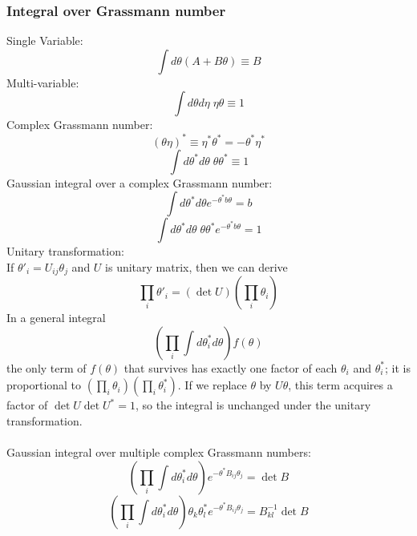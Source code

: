 \subsubsection{Integral over Grassmann number}
\noindent
Single Variable:
\[\int d\theta (A + B\theta) \equiv B\]
Multi-variable:
\[\int d\theta d\eta \; \eta \theta \equiv 1\]
Complex Grassmann number:
\[(\theta \eta)^* \equiv \eta^* \theta^* = -\theta^* \eta^*\]
\[\int d\theta^* d\theta \; \theta \theta^* \equiv 1\]
Gaussian integral over a complex Grassmann number:
\[\int d\theta^* d\theta e^{-\theta^* b \theta} = b\]
\[\int d\theta^* d\theta \; \theta \theta^* e^{-\theta^* b \theta}  = 1\]
Unitary transformation:\\
If $\theta'_i = U_{ij}\theta_j$ and $U$ is unitary matrix, then we can derive
\[\prod_i \theta'_i = (\det U) (\prod_i \theta_i)\]
In a general integral
\[(\prod_i \int d\theta^*_i d\theta) f(\theta)\]
the only term of $f(\theta)$ that survives has exactly one factor of each $\theta_i$ and $\theta^*_i$; it is proportional to $(\prod_i \theta_i)(\prod_i \theta^*_i)$. If we replace $\theta$ by $U\theta$, this term acquires a factor of $\det U \det U^* = 1$, so the integral is unchanged under the unitary transformation.\\ \\
Gaussian integral over multiple complex Grassmann numbers:
\[(\prod_i \int d\theta^*_i d\theta) e^{-\theta^* B_{ij}\theta_j} = \det B\]
\[(\prod_i \int d\theta^*_i d\theta) \theta_k \theta^*_l e^{-\theta^* B_{ij}\theta_j} =B^{-1}_{kl} \det B\]

